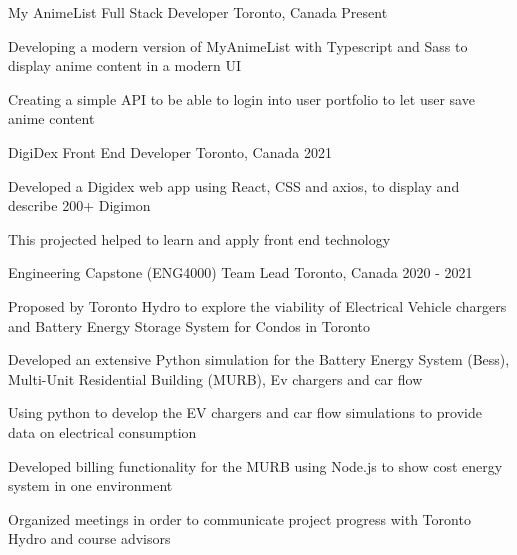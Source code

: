 


\begin{cventries}

\cventry
{My AnimeList} %
{Full Stack Developer} %
{Toronto, Canada} %
{Present} %
{ %
\begin{cvitems}
\item {Developing a modern version of MyAnimeList with Typescript and Sass to display anime content in a modern UI} 
\item {Creating a simple API to be able to login into user portfolio to let user save anime content} 
\end{cvitems}
}

% 


\cventry
{DigiDex} %
{Front End Developer} %
{Toronto, Canada} %
{2021} %
{ %
\begin{cvitems}
\item {Developed a Digidex web app using React, CSS and axios, to display and describe 200+ Digimon} 
\item {This projected helped to learn and apply front end technology } 
\end{cvitems}
}


\cventry
{Engineering Capstone (ENG4000)} %
{Team Lead} %
{Toronto, Canada} %
{2020 - 2021} %
{ %
\begin{cvitems}
\item {Proposed by Toronto Hydro to explore the viability of Electrical Vehicle chargers and Battery Energy Storage System for Condos in Toronto}
\item {Developed an extensive Python simulation for the Battery Energy System (Bess), Multi-Unit Residential Building (MURB), Ev chargers and car flow}
\item {Using python to develop the EV chargers and car flow simulations to provide data on electrical consumption}
\item {Developed billing functionality for the MURB using Node.js  to show cost energy system in one environment}
\item {Organized meetings in order to communicate project progress with Toronto Hydro and course advisors}
\end{cvitems}
}



\end{cventries}